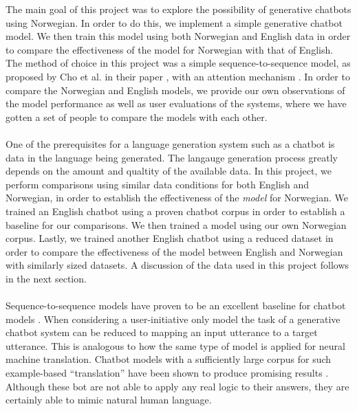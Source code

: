 \documentclass{article}
\begin{document}
The main goal of this project was to explore the possibility of generative
chatbots using Norwegian. In order to do this, we implement a simple generative
chatbot model. We then train this model using both Norwegian and English data
in order to compare the effectiveness of the model for Norwegian with that of
English. The method of choice in this project was a simple sequence-to-sequence
model, as proposed by Cho et al. in their paper \cite{Cho2014}, with an
attention mechanism \cite{Bahdanau2015}. In order to compare the Norwegian and
English models, we provide our own observations of the model performance as
well as user evaluations of the systems, where we have gotten a set of people
to compare the models with each other.

\paragraph{}
One of the prerequisites for a language generation system such as a chatbot is
data in the language being generated. The langauge generation process greatly
depends on the amount and qualtity of the available data. In this project, we
perform comparisons using similar data conditions for both English and Norwegian,
in order to establish the effectiveness of the \emph{model} for Norwegian. We
trained an English chatbot using a proven chatbot corpus in order to establish
a baseline for our comparisons. We then trained a model using our own
Norwegian corpus. Lastly, we trained another English chatbot using a reduced
dataset in order to compare the effectiveness of the model between English and
Norwegian with similarly sized datasets. A discussion of the data used in this
project follows in the next section.

\paragraph{}
Sequence-to-sequence models have proven to be an excellent baseline for
chatbot models \cite{Vinyals2015}. When considering a user-initiative only
model the task of a generative chatbot system can be reduced to mapping an
input utterance to a target utterance. This is analogous to how the same type
of model is applied for neural machine translation. Chatbot models with a
sufficiently large corpus for such example-based ``translation'' have been
shown to produce promising results \cite{Ezquerra2018}. Although these bot are
not able to apply any real logic to their answers, they are certainly able to
mimic natural human language.
\end{document}
